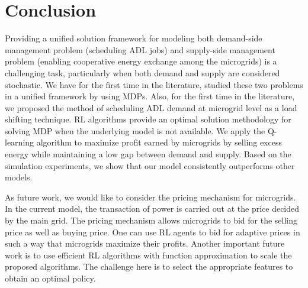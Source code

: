 \documentclass[conference]{IEEEtran}
\begin{document}
\section{Conclusion}\label{sec:conclusion}
Providing a unified solution framework for modeling both demand-side management problem (scheduling ADL jobs) and supply-side management problem (enabling cooperative energy exchange among the microgrids) is a challenging task, particularly when both demand and supply are considered stochastic. We have for the first time in the literature, studied these two problems in a unified framework by using MDPs. Also, for the first time in the literature, we proposed the method of scheduling ADL demand at microgrid level as a load shifting technique. RL algorithms provide an optimal solution methodology for solving MDP when the underlying model is not available. We apply the Q-learning algorithm to maximize profit earned by microgrids by selling excess energy while maintaining a low gap between demand and supply. Based on the simulation experiments, we show that our model consistently outperforms other models.

As future work, we would like to consider the pricing mechanism for microgrids. In the current model, the transaction of power is carried out at the price decided by the main grid. The pricing mechanism allows microgrids to bid for the selling price as well as buying price. One can use RL agents to bid for adaptive prices in such a way that microgrids maximize their profits. Another important future work is to use efficient RL algorithms with function approximation to scale the proposed algorithms. The challenge here is to select the appropriate features to obtain an optimal policy.




 
 
\end{document}
